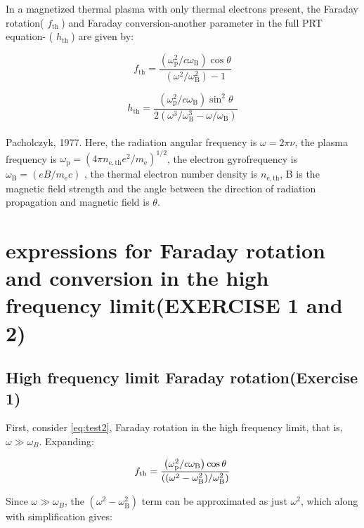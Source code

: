 \documentclass[apj]{emulateapj}
\begin{document}
In a magnetized thermal plasma with only thermal electrons present, the Faraday rotation( $f_{\text {th }} $) and Faraday conversion-another parameter in the full PRT equation- ( $h_{\text {th }} $) are given by: 



\begin{equation}\label{eq:test2}
f_{\mathrm{th}}  =\frac{\left(\omega_{\mathrm{p}}^2 / c \omega_{\mathrm{B}}\right) \cos \theta}{\left(\omega^2 / \omega_{\mathrm{B}}^2\right)-1} 
\end{equation}



\begin{equation}\label{eq:test3}
h_{\mathrm{th}} =\frac{\left(\omega_{\mathrm{p}}^2 / c \omega_{\mathrm{B}}\right) \sin ^2 \theta}{2\left(\omega^3 / \omega_{\mathrm{B}}^3-\omega / \omega_{\mathrm{B}}\right)}
\end{equation}
\\

Pacholczyk, 1977. Here,  the radiation angular frequency is $\omega=2 \pi \nu
$, the plasma frequency is $\omega_{\mathrm{p}}=\left(4 \pi n_{\mathrm{e}, \mathrm{th}} e^2 / m_{\mathrm{e}}\right)^{1 / 2}
$, the electron gyrofrequency is $
\omega_{\mathrm{B}}=\left(e B / m_{\mathrm{e}} c\right)
$ , the thermal electron number density is  $
n_{\mathrm{e}, \mathrm{th}}
$, B is the magnetic field strength and the angle between the direction of radiation propagation and magnetic field is $\theta$. 

\section{expressions for Faraday rotation and conversion in the high frequency limit(EXERCISE 1 and 2)}
\subsection{High frequency limit Faraday rotation(Exercise 1)}

First, consider \eqref{eq:test2}, Faraday rotation in the high frequency limit, that is, $\omega \gg \omega_B$. Expanding: 

$$
f_{\mathrm{th}}  =\frac{\left(\omega_{\mathrm{p}}^2 / c \omega_{\mathrm{B}}\right) \cos \theta}{((\omega^2-\omega_{\mathrm{B}}^2) / \omega_{\mathrm{B}}^2)} \\
$$


 
Since $\omega \gg \omega_B$, the ${(\omega^2-\omega_{\mathrm{B}}^2)}$ term can be approximated as just ${\omega^2}$, which along with simplification gives: 
\end{document}
